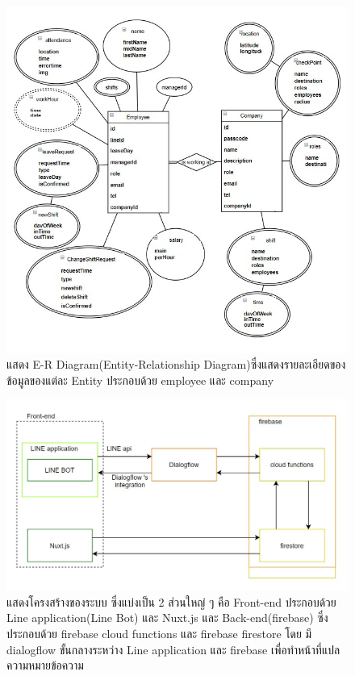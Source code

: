 \begin{figure}
\begin{center}
\includegraphics[width=14cm,keepaspectratio]{./images/ERdiagram2.jpg}
\end{center}
\caption[Poem]{แสดง E-R Diagram(Entity-Relationship Diagram)ซึ่งแสดงรายละเอียดของข้อมูลของแต่ละ Entity ประกอบด้วย employee และ company}
\end{figure}

\begin{figure}
\begin{center}
\includegraphics[width=14cm,keepaspectratio]{./images/structure.jpg}
\end{center}
\caption[Poem]{
  แสดงโครงสร้างของระบบ ซึ่งแบ่งเป็น 2 ส่วนใหญ่ ๆ คือ 
  Front-end ประกอบด้วย Line application(Line Bot) และ Nuxt.js 
  และ Back-end(firebase) ซึ่งประกอบด้วย firebase cloud functions และ firebase firestore 
  โดย มี dialogflow ขั้นกลางระหว่าง Line application และ firebase เพื่อทำหน้าที่แปลความหมายข้อความ
}
\end{figure}